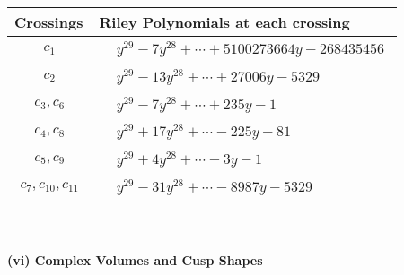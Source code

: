 \documentclass[1p]{elsarticle_modified}
\theoremstyle{definition}
\begin{document}
\begin{tabular}{m{50pt}|m{274pt}}
Crossings & \hspace{64pt}Riley Polynomials at each crossing \\
\hline $$\begin{aligned}c_{1}\end{aligned}$$&$\begin{aligned}
&y^{29}-7 y^{28}+\cdots+5100273664 y-268435456
\end{aligned}$\\
\hline $$\begin{aligned}c_{2}\end{aligned}$$&$\begin{aligned}
&y^{29}-13 y^{28}+\cdots+27006 y-5329
\end{aligned}$\\
\hline $$\begin{aligned}c_{3},c_{6}\end{aligned}$$&$\begin{aligned}
&y^{29}-7 y^{28}+\cdots+235 y-1
\end{aligned}$\\
\hline $$\begin{aligned}c_{4},c_{8}\end{aligned}$$&$\begin{aligned}
&y^{29}+17 y^{28}+\cdots-225 y-81
\end{aligned}$\\
\hline $$\begin{aligned}c_{5},c_{9}\end{aligned}$$&$\begin{aligned}
&y^{29}+4 y^{28}+\cdots-3 y-1
\end{aligned}$\\
\hline $$\begin{aligned}c_{7},c_{10},c_{11}\end{aligned}$$&$\begin{aligned}
&y^{29}-31 y^{28}+\cdots-8987 y-5329
\end{aligned}$\\
\hline
\end{tabular}\\~\\
\newpage\flushleft \textbf{(vi) Complex Volumes and Cusp Shapes}
\end{document}
